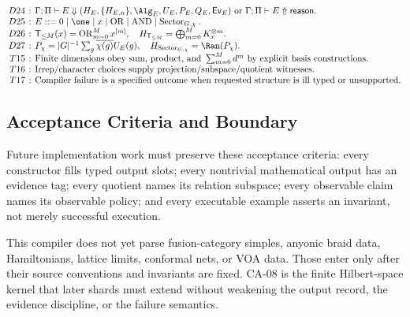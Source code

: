 {\small
\[
\setlength{\arraycolsep}{2pt}
\begin{array}{rcl}
D24 &:& \Gamma;\Pi\vdash E\Downarrow(H_E,\{H_{E,n}\},\Alg_E,U_E,P_E,Q_E,\mathsf{Ev}_E)
        \text{ or } \Gamma;\Pi\vdash E\Uparrow\mathsf{reason}.\\
D25 &:& E::=0\mid\one\mid x\mid\operatorname{OR}\mid\operatorname{AND}
        \mid\operatorname{Sector}_{G,\chi}.\\
D26 &:& \mathsf T_{\le M}(x)=\operatorname{OR}_{m=0}^{M}x^{[m]},\quad
        H_{\mathsf T_{\le M}}=\bigoplus_{m=0}^{M}K_x^{\otimes m}.\\
D27 &:& P_{\chi}=|G|^{-1}\sum_g\overline{\chi(g)}U_E(g),\quad
        H_{\operatorname{Sector}_{G,\chi}}=\Ran(P_{\chi}).\\
T15 &:& \text{Finite dimensions obey sum, product, and } \sum_{m=0}^{M}d^m
        \text{ by explicit basis constructions.}\\
T16 &:& \text{Irrep/character choices supply projection/subspace/quotient witnesses.}\\
T17 &:& \text{Compiler failure is a specified outcome when requested structure is ill typed or unsupported.}
\end{array}
\]
}

\subsection{Acceptance Criteria and Boundary}

Future implementation work must preserve these acceptance criteria: every
constructor fills typed output slots; every nontrivial mathematical output has an
evidence tag; every quotient names its relation subspace; every observable claim
names its observable policy; and every executable example asserts an invariant,
not merely successful execution.

This compiler does not yet parse fusion-category simples, anyonic braid data,
Hamiltonians, lattice limits, conformal nets, or VOA data.  Those enter only
after their source conventions and invariants are fixed.  CA-08 is the finite
Hilbert-space kernel that later shards must extend without weakening the output
record, the evidence discipline, or the failure semantics.
